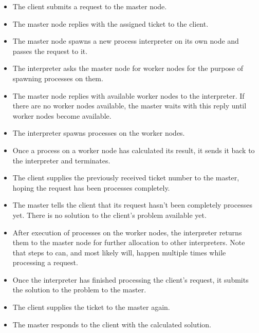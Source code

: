 \begin{itemize}
  \item [\figannotation{1}] The client submits a request to the master node.
  \vspace*{-0.1em}
  \item [\figannotation{2}] The master node replies with the assigned ticket to the client.
  \vspace*{-0.1em}
  \item [\figannotation{3}] The master node spawns a new process interpreter on its own node and passes the request to it.
  \vspace*{-0.1em}
  \item [\figannotation{4}] The interpreter asks the master node for worker nodes for the purpose of spawning processes on them.
  \vspace*{-0.1em}
  \item [\figannotation{5}] The master node replies with available worker nodes to the interpreter. If there are no worker nodes available, the master waits with this reply until worker nodes become available.
  \vspace*{-0.1em}
  \item [\figannotation{6}] The interpreter spawns processes on the worker nodes.
  \vspace*{-0.1em}
  \item [\figannotation{7}] Once a process on a worker node has calculated its result, it sends it back to the interpreter and terminates.
  \vspace*{-0.1em}
  \item [\figannotation{8}] The client supplies the previously received ticket number to the master, hoping the request has been processes completely.
  \vspace*{-0.1em}
  \item [\figannotation{9}] The master tells the client that its request hasn't been completely processes yet. There is no solution to the client's problem available yet.
  \vspace*{-0.1em}
  \item [\figannotation{10}] After execution of processes on the worker nodes, the interpreter returns them to the master node for further allocation to other interpreters. Note that steps  to  can, and most likely will, happen multiple times while processing a request.
  \vspace*{-0.1em}
  \item [\figannotation{11}] Once the interpreter has finished processing the client's request, it submits the solution to the problem to the master.
  \vspace*{-0.em}
  \item [\figannotation{12}] The client supplies the ticket to the master again.
  \vspace*{-0.1em}
  \item [\figannotation{13}] The master responds to the client with the calculated solution.
\end{itemize}

